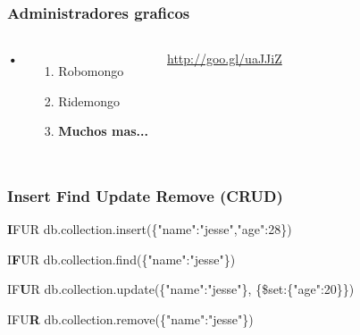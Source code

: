 \documentclass{beamer}
\begin{document}
\begin{frame}
\frametitle{Administradores graficos}
\begin{columns}[c] %

\textbf{•}
\begin{enumerate}
\item Robomongo
\item Ridemongo
\item \textbf{Muchos mas...}
\end{enumerate}

{\color{blue}\url{http://goo.gl/uaJJiZ}}
\end{columns}

\end{frame}

\begin{frame}
\frametitle{Insert Find Update Remove (CRUD)}
\begin{block}{\textbf{I}FUR}
db.collection.insert(\{"name":"jesse","age":28\})
\end{block}
\begin{block}{I\textbf{F}UR}
db.collection.find(\{"name":"jesse"\})
\end{block}
\begin{block}{IF\textbf{U}R}
db.collection.update(\{"name":"jesse"\},
\{\$set:\{"age":20\}\})
\end{block}
\begin{block}{IFU\textbf{R}}
db.collection.remove(\{"name":"jesse"\})
\end{block}
\end{frame}

\end{document}
